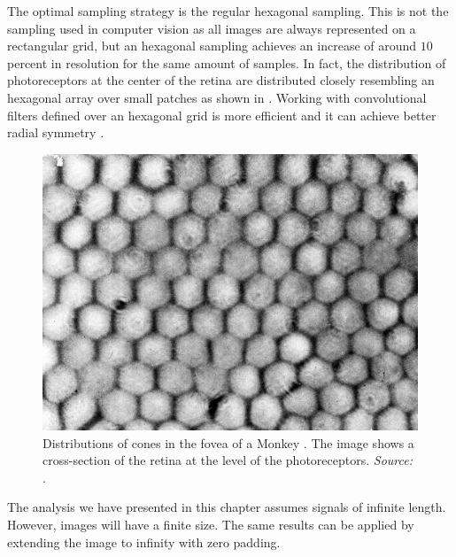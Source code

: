 The optimal sampling strategy is the regular hexagonal sampling. This is not the sampling used in computer vision as all images are always represented on a rectangular grid, but an hexagonal sampling achieves an increase of around $10$ percent in resolution for the same amount of samples. In fact, the distribution of photoreceptors at the center of the retina \cite{Curcio87,Curcio1990} are distributed closely resembling an hexagonal array over small patches as shown in \fig{\ref{fig:samplingfovea}}. 
Working with convolutional filters defined over an hexagonal grid is more efficient and it can achieve better radial symmetry \cite{Mersereau79,Simoncelli90subbandimage}. 




\begin{figure}[t]
\centerline{
\includegraphics[width=.6\linewidth]{figures/Image_processing_sampling/sampling_fovea.jpg}}
\caption{Distributions of cones in the fovea of a Monkey  \cite{Curcio1990}. The image shows a cross-section of the retina at the level of the photoreceptors. {\em Source:} \cite{Curcio1990}.} 
\label{fig:samplingfovea}
\end{figure}

The analysis we have presented in this chapter assumes signals of infinite length. However, images will have a finite size. The same results can be applied by extending the image to infinity with zero padding.


